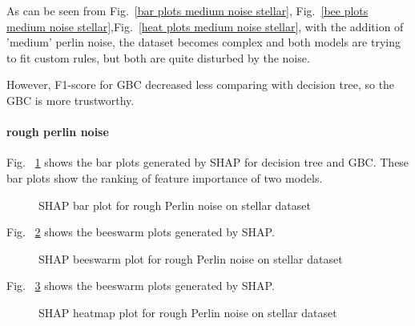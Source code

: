 \documentclass[runningheads,a4paper]{llncs}
\begin{document}
As can be seen from Fig.~\ref{bar plots medium noise stellar}, Fig.~\ref{bee plots medium noise stellar},Fig.~\ref{heat plots medium noise stellar}, with the addition of 'medium' perlin noise, the dataset becomes complex and both models are trying to fit custom rules, but both are quite disturbed by the noise.

However, F1-score for GBC decreased less comparing with decision tree, so the GBC is more trustworthy.


\paragraph{rough perlin noise}

Fig. ~\ref{bar plots rough noise stellar} shows the bar plots generated by SHAP for decision tree and GBC. These bar plots show the ranking of feature importance of two models.
\begin{figure}[H]
	\centering
	
	\hfill
	
	
	\caption{SHAP bar plot for rough Perlin noise on stellar dataset}
	\label{bar plots rough noise stellar}
\end{figure}



Fig. ~\ref{bee plots rough noise stellar} shows the beeswarm plots generated by SHAP.
\begin{figure}[H]
	\centering
	
	\hfill
	
	
	\caption{SHAP beeswarm plot for rough Perlin noise on stellar dataset}
	\label{bee plots rough noise stellar}
	
\end{figure}
Fig. ~\ref{heat plots rough noise stellar} shows the beeswarm plots generated by SHAP.
\begin{figure}[H]
	\centering
	
	\hfill
	
	
	\caption{SHAP heatmap plot for rough Perlin noise  on stellar dataset}
	\label{heat plots rough noise stellar}
	
\end{figure}
\end{document}
